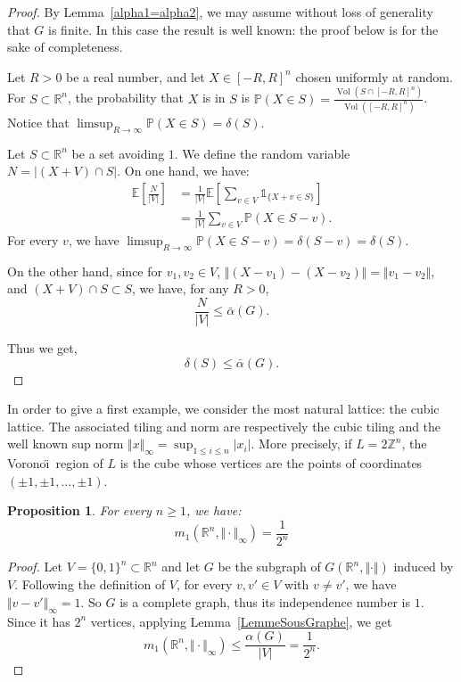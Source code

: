 \documentclass{amsart}                     %
\newtheorem{prop}{Proposition}
\newcommand{\Z}{{\mathbb Z}}
\newcommand{\R}{{\mathbb R}}
\renewcommand{\P}{{\mathbb P}}
\newcommand{\E}{{\mathbb E}}
\newcommand{\Vol}{\operatorname{Vol}}
\newcommand{\lref}[1]{Lemma~\textup{\ref{#1}}}
\begin{document}
\begin{proof}
By \lref{alpha1=alpha2}, we may assume without loss of generality that $G$ is finite. In this case the result is well known: the proof below is for the sake of completeness.




Let $R>0$ be a real number, and let $X\in [-R,R]^n$ chosen uniformly at random. For $S\subset \R^n$, the probability that $X$ is in $S$ is $\P(X\in S)= \frac{\Vol(S\cap [-R,R]^n)}{\Vol ([-R,R]^n)}$. Notice that $\limsup_{R\to\infty} \P(X \in S) = \delta(S)$. 

Let $S\subset\R^n$ be a set avoiding $1$. We define the random variable $N=|(X+V)\cap S|$. On one hand, we have:
$$\begin{aligned} \E\left[\frac{N}{|V|}\right]&=\frac{1}{|V|}\E\left[\sum_{v\in V} \mathds{1}_{\{ X + v\in S \}} \right] \\& =\frac{1}{|V|} \sum_{v\in V} \P( X\in S-v). \end{aligned}$$
For every $v$, we have $\limsup_{R\to\infty} \P( X\in S-v)=\delta(S-v)=\delta(S)$. 

On the other hand, since for $v_1,v_2\in V$, ${\Vert  (X-v_1)-(X-v_2)\Vert  =\Vert  v_1-v_2\Vert  }$, and $(X+V)\cap S\subset S$, we have, for any $R>0$, 
$$ \frac{N}{|V|} \leq \bar{\alpha}(G). $$

Thus we get, 
$$\delta(S)\leq \bar{\alpha}(G).$$


\end{proof}



In order to give a first example, we consider the most natural lattice: the cubic lattice. The associated tiling and norm are respectively the cubic tiling and the well known sup norm 
$\Vert x\Vert  _\infty=\sup_{1\leq i\leq n} |x_i|$. More precisely, if $L=2\Z^n$, the Vorono\"\i\  region of $L$ is the cube whose vertices are the points of coordinates $(\pm 1,\pm 1,\ldots,\pm 1)$.

\begin{prop}
For every $n\geq1$, we have:
$$m_1(\R^n, \Vert   \cdot\Vert  _\infty)=\frac{1}{2^n}$$
\end{prop}

\begin{proof}
Let $V=\{0,1\}^n\subset \R^n$ %
  and let $G$ be the subgraph of $G(\R^n,\Vert \cdot \Vert)$ induced by $V$. Following the definition of $V$, for every $v,v'\in V$ with $v\neq v'$, we have $\Vert  v-v'\Vert  _\infty=1$. So $G$ is a complete graph, thus its independence number is $1$. Since it has $2^n$ vertices, applying \lref{LemmeSousGraphe}, we get
$$ m_1(\R^n, \Vert   \cdot\Vert  _\infty) \leq \frac{\alpha(G)}{|V|} =\frac{1}{2^n}.$$ 
\end{proof}
\end{document}
